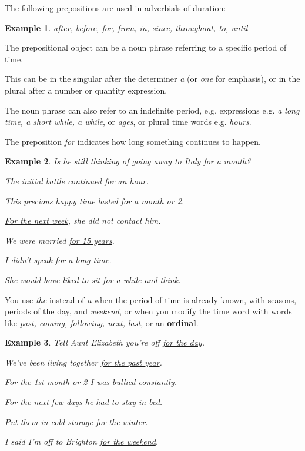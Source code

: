 \documentclass[oneside]{book}
\numberwithin{equation}{section}
\newtheorem{example}{Example}[section]
\begin{document}
The following prepositions are used in adverbials of duration:
\begin{example}
    after, before, for, from, in, since, throughout, to, until
\end{example}
The prepositional object can be a noun phrase referring to a specific period of time.

This can be in the singular after the determiner \textit{a} (or \textit{one} for emphasis), or in the plural after a number or quantity expression.

%
The noun phrase can also refer to an indefinite period, e.g. expressions e.g. \textit{a long time, a short while, a while}, or \textit{ages}, or plural time words e.g. \textit{hours}.

%
\noindent{} The preposition \textit{for} indicates how long something continues to happen.
\begin{example}
    Is he still thinking of going away to Italy \underline{for a month}?
    
    The initial battle continued \underline{for an hour}.
    
    This precious happy time lasted \underline{for a month or 2}.
    
    \underline{For the next week}, she did not contact him.
    
    We were married \underline{for 15 years}.
    
    I didn't speak \underline{for a long time}.
    
    She would have liked to sit \underline{for a while} and think.
\end{example}
You use \textit{the} instead of \textit{a} when the period of time is already known, with seasons, periods of the day, and \textit{weekend}, or when you modify the time word with words like \textit{past, coming, following, next, last}, or an \textbf{ordinal}.
\begin{example}
    Tell Aunt Elizabeth you're off \underline{for the day}.
    
    We've been living together \underline{for the past year}.
    
    \underline{For the 1st month or 2} I was bullied constantly.
    
    \underline{For the next few days} he had to stay in bed.
    
    Put them in cold storage \underline{for the winter}.
    
    I said I'm off to Brighton \underline{for the weekend}.
\end{example}
\end{document}
